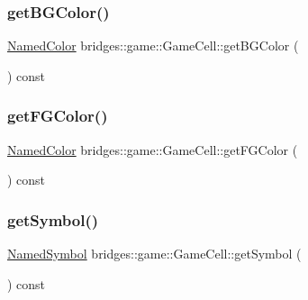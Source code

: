 \subsubsection{\texorpdfstring{getBGColor()}{getBGColor()}}
{\footnotesize\ttfamily \mbox{\hyperlink{namespacebridges_1_1game_afaa832a4322b25b6a4ebfba832f10f26}{Named\+Color}} bridges\+::game\+::\+Game\+Cell\+::get\+B\+G\+Color (\begin{DoxyParamCaption}{ }\end{DoxyParamCaption}) const\hspace{0.3cm}{\ttfamily [inline]}}

\mbox{\label{classbridges_1_1game_1_1_game_cell_af9269057618ffdd503768ccd6b6e6f56}} 
\subsubsection{\texorpdfstring{getFGColor()}{getFGColor()}}
{\footnotesize\ttfamily \mbox{\hyperlink{namespacebridges_1_1game_afaa832a4322b25b6a4ebfba832f10f26}{Named\+Color}} bridges\+::game\+::\+Game\+Cell\+::get\+F\+G\+Color (\begin{DoxyParamCaption}{ }\end{DoxyParamCaption}) const\hspace{0.3cm}{\ttfamily [inline]}}

\mbox{\label{classbridges_1_1game_1_1_game_cell_a55ed5769afe548a707117379425613f0}} 
\subsubsection{\texorpdfstring{getSymbol()}{getSymbol()}}
{\footnotesize\ttfamily \mbox{\hyperlink{namespacebridges_1_1game_ab9a19c7ab6e2ebac2f95180e21733487}{Named\+Symbol}} bridges\+::game\+::\+Game\+Cell\+::get\+Symbol (\begin{DoxyParamCaption}{ }\end{DoxyParamCaption}) const\hspace{0.3cm}{\ttfamily [inline]}}

\mbox{\label{classbridges_1_1game_1_1_game_cell_ac2ee6a35500564b3df970551dcf56892}} 
